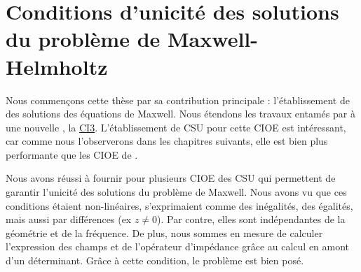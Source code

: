 \chapter[Unicité des solutions de Maxwell]{Conditions d'unicité des solutions du problème de Maxwell-Helmholtz}
\label{sec:csu}
\minitoc
\newpage
{}
Nous commençons cette thèse par sa contribution principale : l'établissement de  des solutions des équations de Maxwell.
Nous étendons les travaux entamés par \cite{stupfel_sufficient_2011} à une nouvelle , la \hyperlink{ci3}{CI3}.
L'établissement de CSU pour cette CIOE est intéressant, car comme nous l'observerons dans les chapitres suivants, elle est bien plus performante que les CIOE de \cite{stupfel_sufficient_2011}.





Nous avons réussi à fournir pour plusieurs CIOE des CSU qui permettent de garantir l'unicité des solutions du problème de Maxwell.
Nous avons vu que ces conditions étaient non-linéaires, s'exprimaient comme des inégalités, des égalités, mais aussi par différences (ex \(z\not=0\)).
Par contre, elles sont indépendantes de la géométrie et de la fréquence.
De plus, nous sommes en mesure de calculer l'expression des champs et de l'opérateur d'impédance grâce au calcul en amont d'un déterminant.
Grâce à cette condition, le problème est bien posé.